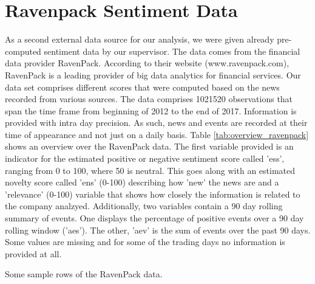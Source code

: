 \section{Ravenpack Sentiment Data}
As a second external data source for our analysis, we were given already pre-computed sentiment data by our supervisor. The data comes from the financial data provider RavenPack. According to their website (www.ravenpack.com), RavenPack is a leading provider of big data analytics for financial services\nocite{RavenPack}. Our data set comprises different scores that were computed based on the news recorded from various sources. The data comprises 1021520 observations that span the time frame from beginning of 2012 to the end of 2017. Information is provided with intra day precision. As such, news and events are recorded at their time of appearance and not just on a daily basis. Table \ref{tab:overview_ravenpack} shows an overview over the RavenPack data. The first variable provided is an indicator for the estimated positive or negative sentiment score called 'ess', ranging from 0 to 100, where 50 is neutral. This goes along with an estimated novelty score called 'ens' (0-100) describing how 'new' the news are and a 'relevance' (0-100) variable that shows how closely the information is related to the company analzyed. Additionally, two variables contain a 90 day rolling summary of events. One displays the percentage of positive events over a 90 day rolling window ('aes'). The other, 'aev' is the sum of events over the past 90 days. Some values are missing and for some of the trading days no information is provided at all. \\

\begin{table}[h!]
    \centering
    \small
    
    \caption{Some sample rows of the RavenPack data.}
    \label{tab:overview_ravenpack}
\end{table}
